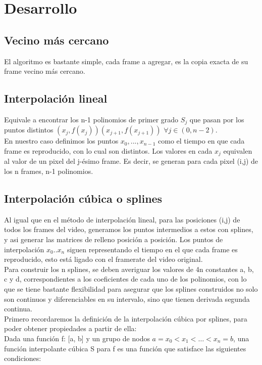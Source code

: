 \section{Desarrollo}

\subsection{Vecino más cercano}
El algoritmo es bastante simple, cada frame a agregar, es la copia exacta de su frame vecino más cercano.\\

\subsection{Interpolación lineal}
Equivale a encontrar los n-1 polinomios de primer grado $S_{j}$ que pasan por los puntos distintos $(x_{j},f(x_{j}))(x_{j+1},f(x_{j+1}))$ $\forall j \in (0,n-2)$.\\
En nuestro caso definimos los puntos $x_{0}, ... , x_{n-1}$ como el tiempo en que cada frame es reproducido, con lo cual son distintos. Los valores en cada $x_{j}$ equivalen al valor de un pixel del j-ésimo frame. Es decir, se generan para cada pixel (i,j) de los n frames, n-1 polinomios.\\


\subsection{Interpolación cúbica o splines}

Al igual que en el método de interpolación lineal, para las posiciones (i,j) de todos los frames del video, generamos los puntos intermedios a estos con splines, y asi generar las matrices de relleno posición a posición. Los puntos de interpolación $x_{0} .. x_{n}$ siguen representando el tiempo en el que cada frame es reproducido, esto está ligado con el framerate del video original.\\

Para construir los n splines, se deben averiguar los valores de 4n constantes a, b, c y d, correspondientes a los coeficientes de cada uno de los polinomios, con lo que se tiene bastante flexibilidad para asegurar que los splines construidos no solo son continuos y diferenciables en su intervalo, sino que tienen derivada segunda continua.\\
Primero recordaremos la definición de la interpolación cúbica por splines, para poder obtener propiedades a partir de ella: \\
Dada una función f: [a, b] y un grupo de nodos $a= x_{0} < x_{1} < … < x_{n} = b$, una función interpolante cúbica S para f es una función que satisface las siguientes condiciones: \\

